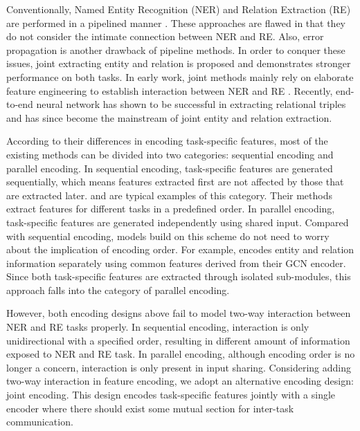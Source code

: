 \documentclass[11pt]{article}
\begin{document}
Conventionally, Named Entity Recognition (NER) and Relation Extraction (RE) are performed in a pipelined manner \citep{zelenko2003, chan-roth-2011-exploiting}. These approaches are flawed in that they do not consider the intimate connection between NER and RE. Also, error propagation is another drawback of pipeline methods. In order to conquer these issues, joint extracting entity and relation is proposed and demonstrates stronger performance on both tasks. In early work, joint methods mainly rely on elaborate feature engineering to establish interaction between NER and RE \citep{yu-lam-2010-jointly, li-ji-2014-incremental, miwa-sasaki-2014-modeling}. Recently, end-to-end neural network has shown to be successful in extracting relational triples \citep{zeng-etal-2014-relation, gupta-etal-2016-table, katiyar-cardie-2017-going, shen2021trigger} and has since become the mainstream of joint entity and relation extraction.


According to their differences in encoding task-specific features, most of the existing methods can be divided into two categories: sequential encoding and parallel encoding. In sequential encoding, task-specific features are generated sequentially, which means features extracted first are not affected by those that are extracted later. \citet{zeng-etal-2018-extracting} and \citet{wei-etal-2020-novel} are typical examples of this category. Their methods extract features for different tasks in a predefined order. In parallel encoding, task-specific features are generated independently using shared input. Compared with sequential encoding, models build on this scheme do not need to worry about the implication of encoding order. For example, \citet{fu-etal-2019-graphrel} encodes entity and relation information separately using common features derived from their GCN encoder. Since both task-specific features are extracted through isolated sub-modules, this approach falls into the category of parallel encoding.   

However, both encoding designs above fail to model two-way interaction between NER and RE tasks properly. In sequential encoding, interaction is only unidirectional with a specified order, resulting in different amount of information exposed to NER and RE task. In parallel encoding, although encoding order is no longer a concern, interaction is only present in input sharing. Considering adding two-way interaction in feature encoding, we adopt an alternative encoding design: joint encoding. This design encodes task-specific features jointly with a single encoder where there should exist some mutual section for inter-task communication. 
\end{document}
